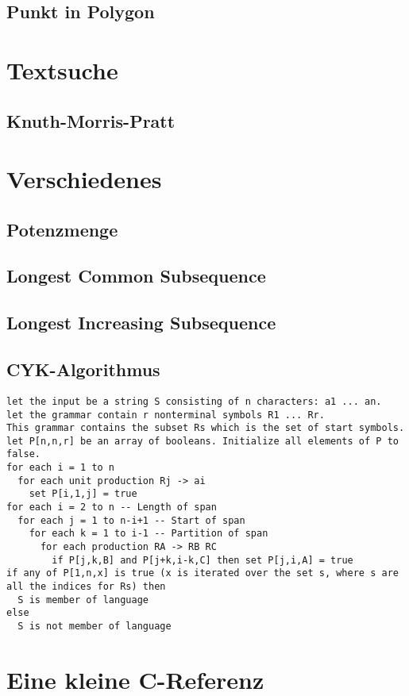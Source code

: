 \documentclass[10pt,a4paper,ngerman]{article}
\begin{document}
\begin{multicols}{2}
\subsection{Punkt in Polygon}


\section{Textsuche}
\subsection{Knuth-Morris-Pratt}


\section{Verschiedenes}
\subsection{Potenzmenge}

\subsection{Longest Common Subsequence}

\subsection{Longest Increasing Subsequence}

\subsection{CYK-Algorithmus}
\begin{lstlisting}
let the input be a string S consisting of n characters: a1 ... an.
let the grammar contain r nonterminal symbols R1 ... Rr.
This grammar contains the subset Rs which is the set of start symbols.
let P[n,n,r] be an array of booleans. Initialize all elements of P to false.
for each i = 1 to n
  for each unit production Rj -> ai
    set P[i,1,j] = true
for each i = 2 to n -- Length of span
  for each j = 1 to n-i+1 -- Start of span
    for each k = 1 to i-1 -- Partition of span
      for each production RA -> RB RC
        if P[j,k,B] and P[j+k,i-k,C] then set P[j,i,A] = true
if any of P[1,n,x] is true (x is iterated over the set s, where s are all the indices for Rs) then
  S is member of language
else
  S is not member of language
\end{lstlisting}
\section{Eine kleine C-Referenz}
\end{multicols}






\end{document}
